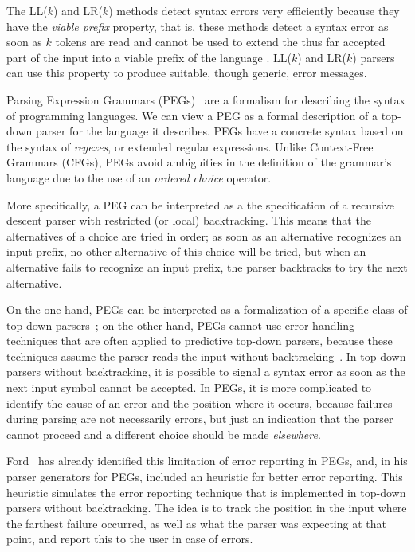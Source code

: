 \documentclass[3p,12pt,singlecolumn]{elsarticle}
\begin{document}
The LL($k$) and LR($k$) methods detect syntax errors very efficiently
because they have the \emph{viable prefix} property, that is,
these methods detect a syntax error as soon as $k$ tokens are read
and cannot be used to extend the thus far accepted part of the input
into a viable prefix of the language
\cite{aho2006cpt}. LL($k$) and LR($k$) parsers can use this
property to produce suitable, though generic, error
messages.

Parsing Expression Grammars (PEGs)~\cite{ford2004peg} are a
formalism for describing the syntax of programming languages.
We can view a PEG as a formal description of a top-down parser
for the language it describes. PEGs have a concrete syntax based on
the syntax of {\em regexes}, or extended regular expressions.
Unlike Context-Free Grammars (CFGs),
PEGs avoid ambiguities in the definition of the grammar's
language due to the use of an {\em ordered choice} operator.

More specifically, a PEG can be interpreted as a the specification
of a recursive
descent parser with restricted (or local) backtracking.
This means that the alternatives of a choice are tried in
order; as soon as an alternative recognizes an input prefix,
no other alternative of this choice will be tried, but when an
alternative fails to recognize an input prefix, the parser
backtracks to try the next alternative.

On the one hand, PEGs can be interpreted as a formalization of a
specific class of top-down parsers~\cite{ford2004peg}; on the other hand,
PEGs cannot use error handling techniques that are often applied
to predictive top-down parsers, because these techniques assume the parser
reads the input without backtracking~\cite{ford2002packrat}.
In top-down parsers without backtracking, it is possible to
signal a syntax error as soon as the next input symbol cannot be accepted.
In PEGs, it is more complicated to identify the cause
of an error and the position where it occurs, because failures
during parsing are not necessarily errors, but just an
indication that the parser cannot proceed and a different
choice should be made \emph{elsewhere}.

Ford~\cite{ford2002packrat} has already identified this
limitation of error reporting in PEGs, and, in his
parser generators for PEGs, included an heuristic for
better error reporting. This heuristic simulates the error
reporting technique that is implemented in top-down parsers
without backtracking. The idea is to track the position
in the input where the farthest failure occurred, as
well as what the parser was expecting
at that point, and report this to the user in case of errors.
\end{document}

